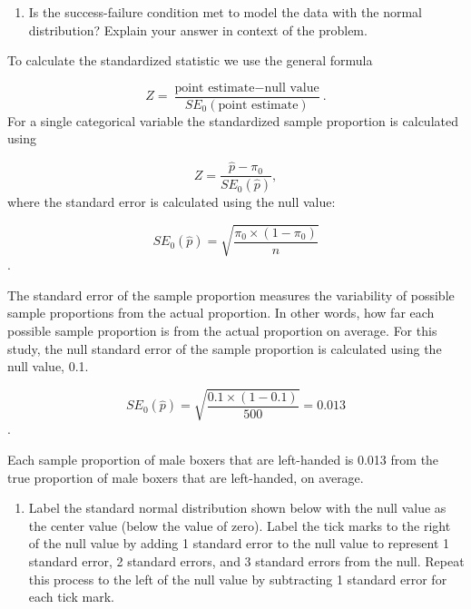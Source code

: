 \documentclass[
]{report}
\providecommand{\tightlist}{%
  \setlength{\itemsep}{0pt}\setlength{\parskip}{0pt}}
\begin{document}
\vspace{0.5in}

\begin{enumerate}
\def\labelenumi{\arabic{enumi}.}
\setcounter{enumi}{5}
\tightlist
\item
  Is the success-failure condition met to model the data with the normal distribution? Explain your answer in context of the problem.
\end{enumerate}

\vspace{1in}

To calculate the standardized statistic we use the general formula

\[
Z = \frac{\text{point estimate} - \text{null value}}{SE_0(\text{point estimate})}.
\]
For a single categorical variable the standardized sample proportion is calculated using

\[
Z = \frac{\hat{p} - \pi_0}{SE_0(\hat{p})},
\]
where the standard error is calculated using the null value:

\[SE_0(\hat{p})=\sqrt{\frac{\pi_0\times(1-\pi_0)}{n}}\].

The standard error of the sample proportion measures the variability of possible sample proportions from the actual proportion. In other words, how far each possible sample proportion is from the actual proportion on average. For this study, the null standard error of the sample proportion is calculated using the null value, 0.1.

\[SE_0(\hat{p})=\sqrt{\frac{0.1\times(1-0.1)}{500}} = 0.013\].

Each sample proportion of male boxers that are left-handed is 0.013 from the true proportion of male boxers that are left-handed, on average.

\begin{enumerate}
\def\labelenumi{\arabic{enumi}.}
\setcounter{enumi}{6}
\tightlist
\item
  Label the standard normal distribution shown below with the null value as the center value (below the value of zero). Label the tick marks to the right of the null value by adding 1 standard error to the null value to represent 1 standard error, 2 standard errors, and 3 standard errors from the null. Repeat this process to the left of the null value by subtracting 1 standard error for each tick mark.
\end{enumerate}

\vspace{2mm}
\end{document}

